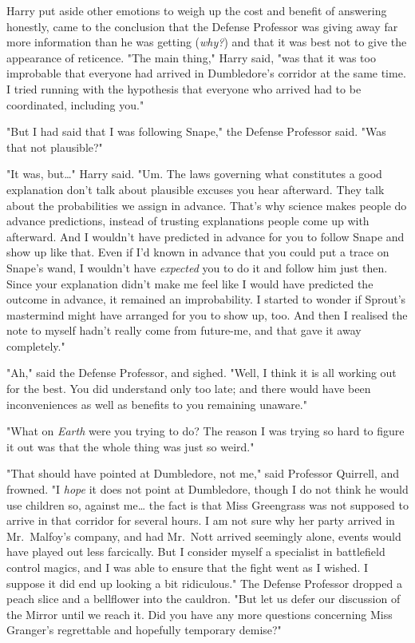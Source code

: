 Harry put aside other emotions to weigh up the cost and benefit of answering 
honestly, came to the conclusion that the Defense Professor was giving away far 
more information than he was getting (\emph{why?}) and that it was best not to 
give the appearance of reticence. "The main thing," Harry said, "was that it 
was too improbable that everyone had arrived in Dumbledore's corridor at the 
same time. I tried running with the hypothesis that everyone who arrived had to 
be coordinated, including you."

"But I had said that I was following Snape," the Defense Professor said. "Was 
that not plausible?"

"It was, but{\ldots}" Harry said. "Um. The laws governing what constitutes a 
good explanation don't talk about plausible excuses you hear afterward. They 
talk about the probabilities we assign in advance. That's why science makes 
people do advance predictions, instead of trusting explanations people come up 
with afterward. And I wouldn't have predicted in advance for you to follow 
Snape and show up like that. Even if I'd known in advance that you could put a 
trace on Snape's wand, I wouldn't have\emph{ expected} you to do it and follow 
him just then. Since your explanation didn't make me feel like I would have 
predicted the outcome in advance, it remained an improbability. I started to 
wonder if Sprout's mastermind might have arranged for you to show up, too. And 
then I realised the note to myself hadn't really come from future-me, and that 
gave it away completely."

"Ah," said the Defense Professor, and sighed. "Well, I think it is all working 
out for the best. You did understand only too late; and there would have been 
inconveniences as well as benefits to you remaining unaware."

"What on \emph{Earth} were you trying to do? The reason I was trying so hard to 
figure it out was that the whole thing was just so weird."

"That should have pointed at Dumbledore, not me," said Professor Quirrell, and 
frowned. "I \emph{hope} it does not point at Dumbledore, though I do not think 
he would use children so, against me{\ldots} the fact is that Miss Greengrass 
was not supposed to arrive in that corridor for several hours. I am not sure 
why her party arrived in Mr.~Malfoy's company, and had Mr.~Nott arrived 
seemingly alone, events would have played out less farcically. But I consider 
myself a specialist in battlefield control magics, and I was able to ensure 
that the fight went as I wished. I suppose it did end up looking a bit 
ridiculous." The Defense Professor dropped a peach slice and a bellflower into 
the cauldron. "But let us defer our discussion of the Mirror until we reach it. 
Did you have any more questions concerning Miss Granger's regrettable and 
hopefully temporary demise?"


